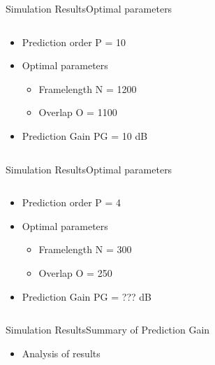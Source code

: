 \begin{frame}{Simulation Results}{Optimal parameters}		
\begin{columns}
	\begin{column}{0.4\textwidth}
	\begin{itemize}
		\item Prediction order P = 10
		\item Optimal parameters
		\begin{itemize}
			\item Framelength N = 1200
			\item Overlap O = 1100
		\end{itemize}
		\item Prediction Gain PG = 10 dB
	\end{itemize}
	\end{column}
	\begin{column}{0.6\textwidth} 
		\resizebox{0.9\columnwidth}{!}{		
			}
	\end{column}
\end{columns}
\end{frame}

\begin{frame}{Simulation Results}{Optimal parameters}		
\begin{columns}
	\begin{column}{0.4\textwidth}
	\begin{itemize}
		\item Prediction order P = 4
		\item Optimal parameters
		\begin{itemize}
			\item Framelength N = 300
			\item Overlap O = 250
		\end{itemize}
		\item Prediction Gain PG = ??? dB
	\end{itemize}
	\end{column}
	\begin{column}{0.6\textwidth} 
		\resizebox{0.9\columnwidth}{!}{		
			}
	\end{column}
\end{columns}
\end{frame}

\begin{frame}{Simulation Results}{Summary of Prediction Gain}	
\begin{itemize}
	\item Analysis of results
\end{itemize}
\end{frame}


